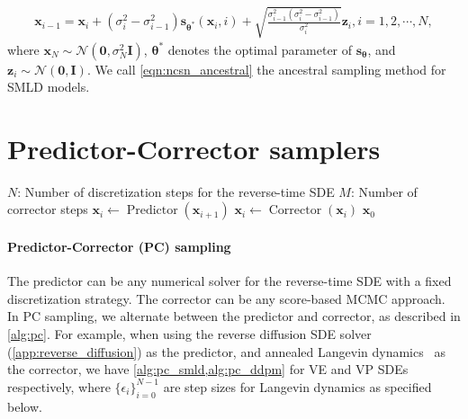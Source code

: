 \documentclass{article} %
\newcommand{\mcal}{\mathcal}
\newcommand{\bfx}{\mathbf{x}}
\newcommand{\bfz}{\mathbf{z}}
\newcommand{\bfI}{\mathbf{I}}
\newcommand{\bfzero}{\mathbf{0}}
\newcommand{\bftheta}{{\boldsymbol{\theta}}}
\newcommand{\bfs}{\mathbf{s}}
\begin{document}
\begin{align}
    \bfx_{i-1} = \bfx_i + (\sigma_i^2 - \sigma_{i-1}^2) \bfs_{\bftheta^*}(\bfx_i, i) + \sqrt{\frac{\sigma_{i-1}^2 (\sigma_i^2 - \sigma_{i-1}^2)}{\sigma_i^2}} \bfz_i, i=1,2,\cdots, N, \label{eqn:ncsn_ancestral}
\end{align}
where $\bfx_N \sim \mcal{N}(\bfzero, \sigma_N^2 \bfI)$, $\bftheta^*$ denotes the optimal parameter of $\bfs_\bftheta$, and $\bfz_i \sim \mcal{N}(\bfzero, \bfI)$. We call \cref{eqn:ncsn_ancestral} the ancestral sampling method for SMLD models.


\section{Predictor-Corrector samplers}\label{app:pc}

\begin{algorithm}[!t]
   \caption{Predictor-Corrector (PC) sampling}
   \label{alg:pc}
    \begin{algorithmic}[1]
        \Require    
            \Statex $N$: Number of discretization steps for the reverse-time SDE
            \Statex $M$: Number of corrector steps
       \State{Initialize $\bfx_N \sim p_T(\bfx)$}
        \State $\bfx_i \gets \operatorname{Predictor}(\bfx_{i+1})$
            \State $\bfx_i \gets \operatorname{Corrector}(\bfx_i)$
         \EndFor
       \EndFor
        $\bfx_0$
    \end{algorithmic}
    \end{algorithm}

\paragraph{Predictor-Corrector (PC) sampling} 
The predictor can be any numerical solver for the reverse-time SDE with a fixed discretization strategy. The corrector can be any score-based MCMC approach. In PC sampling, we alternate between the predictor and corrector, as described in \cref{alg:pc}. For example, when using the reverse diffusion SDE solver (\cref{app:reverse_diffusion}) as the predictor, and annealed Langevin dynamics~\citep{song2019generative} as the corrector, we have \cref{alg:pc_smld,alg:pc_ddpm} for VE and VP SDEs respectively, where $\{\epsilon_i\}_{i=0}^{N-1}$ are step sizes for Langevin dynamics as specified below.
\end{document}
